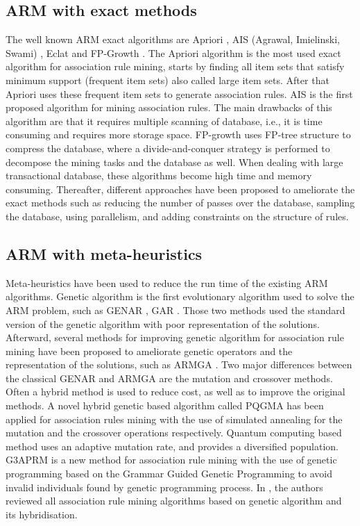 \documentclass[preprint,12pt]{elsarticle}
\begin{document}
\subsection{ARM with exact methods}
The well known ARM exact algorithms are Apriori \cite{5}, AIS (Agrawal, Imielinski, Swami) \cite{1}, 
Eclat \cite{9} and FP-Growth \cite{6}. 
The Apriori algorithm is the most used exact algorithm for association rule mining, starts by finding all item sets that satisfy minimum support 
(frequent item sets) also called large item sets. After that Apriori uses these frequent item sets to generate association rules. 
AIS is the first proposed algorithm for mining association rules. The main drawbacks of this algorithm are that it requires multiple scanning 
of database, i.e., it is time consuming and requires more storage space. FP-growth uses FP-tree structure to compress the database, where 
a divide-and-conquer strategy is performed to decompose the mining tasks and the database as well. When dealing with large transactional database, 
these algorithms become high time and memory consuming. Thereafter, different approaches have 
been proposed to ameliorate the exact methods such as reducing the number of passes over the database, sampling the database, using parallelism, and adding constraints on the structure of rules.

\subsection{ARM with meta-heuristics}
Meta-heuristics have been used to reduce the run time of the existing ARM algorithms. Genetic algorithm is the first evolutionary algorithm used to solve the ARM problem, such as GENAR \cite{16}, GAR \cite{17}. 
Those two methods used the standard version of the genetic algorithm with poor representation of the solutions. Afterward, several methods 
for improving genetic algorithm for association rule mining have been proposed to ameliorate genetic operators and the 
representation of the solutions, such as ARMGA \cite{10}. Two major differences between the classical GENAR and ARMGA are the mutation and crossover methods. Often a hybrid method is used to reduce cost, as well as to improve the original methods. A novel hybrid genetic based algorithm called PQGMA has been applied for association rules mining with the use of simulated annealing for the mutation and the crossover operations respectively.
Quantum computing based method \cite{18} uses an adaptive mutation rate, and provides a diversified population.
G3APRM \cite{11} is a new method for association rule mining  with the use of  genetic programming based on the 
Grammar Guided Genetic Programming to avoid invalid individuals found by genetic programming process. In \cite{19}, 
the authors reviewed all association rule mining algorithms based on genetic algorithm and its hybridisation.
\end{document}
